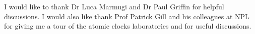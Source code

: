 \begin{acknowledgements}
I would like to thank Dr Luca Marmugi and Dr Paul Griffin for helpful discussions. I would also like thank Prof Patrick Gill and his colleagues at NPL for giving me a tour of the atomic clocks laboratories and for useful discussions.   
\end{acknowledgements}